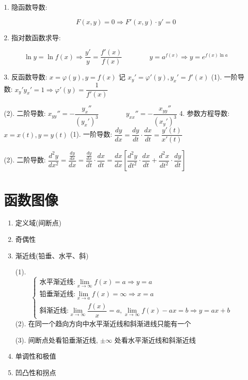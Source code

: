 \begin{theorem}[特殊函数导函数]
1. 隐函数导数: 

$$F(x,y) = 0\Rightarrow F'(x,y) \cdot y'= 0$$

2. 指对数函数求导: 

$$\ln y =\ln f(x)\Rightarrow \frac{y'}{y} = \frac{f'(x)}{f(x)}\qquad\qquad y = a^{f(x)}\Rightarrow y = e^{f(x)\ln a}$$

3. 反函数导数: $x = \varphi(y),y=f(x)$ 记 $x_{y}' = \varphi'(y),y_{x}' = f'(x)$
(1). 一阶导数: $x_{y}' y_{x}' =1\Rightarrow \varphi'(y) = \dfrac{1}{f'(x)}$

(2). 二阶导数: $x_{yy}'' =-\dfrac{y_{x}''}{(y_{x}')^{3}}\qquad\qquad y_{xx}'' = -\dfrac{x_{yy}''}{(x_{y}')^{3}}$
4. 参数方程导数: $x = x(t), y = y(t)$
(1). 一阶导数: $\dfrac{dy}{dx} = \dfrac{dy}{dt}\cdot \dfrac{dx}{dt} = \dfrac{y'(t)}{x'(t)}$

(2). 二阶导数: $\dfrac{d^{2}y}{dx^{2}} = \dfrac{\frac{dy}{dx}}{dx} = \dfrac{\frac{dy}{dx}}{dt}\cdot \dfrac{dx}{dt} = \dfrac{dx}{dx}\left[\dfrac{d^{2}y}{dt^{2}}\cdot \dfrac{dx}{dt}+\dfrac{d^{2}x}{dt^{2}}\cdot \dfrac{dy}{dt}\right]$
\end{theorem}

\section{函数图像}

\begin{definition}[函数图像要点]
	\begin{enumerate}
		\item 定义域(间断点)
		\item 奇偶性
		\item 渐近线(铅垂、水平、斜)
		\begin{anymark}[Points]
			(1). $$\begin{cases}\text{水平渐近线:} \lim\limits_{x\to\infty}f(x)=a\Rightarrow y=a\\
				\text{铅垂渐近线:} \lim\limits_{x\to a}f(x)=\infty\Rightarrow x=a \\
				\text{斜渐近线:} \lim\limits_{x\to\infty}\dfrac{f(x)}{x}=a, \lim\limits_{x\to\infty}f(x)-ax = b\Rightarrow y=ax+b
			\end{cases}$$
			(2). 在同一个趋向方向中水平渐近线和斜渐进线只能有一个

			(3). 间断点处看铅垂渐近线, $\pm \infty$ 处看水平渐近线和斜渐近线
		\end{anymark}
		\item 单调性和极值
		\item 凹凸性和拐点
	\end{enumerate}
\end{definition}

